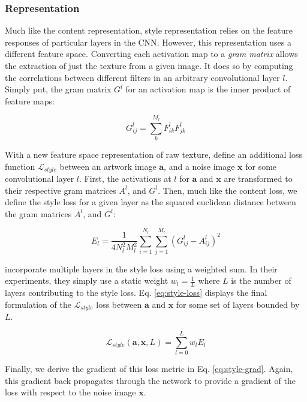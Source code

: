 \documentclass{article}
\begin{document}
\subsubsection{Representation}

Much like the content representation, style representation relies on the
feature responses of particular layers in the \ac{CNN}. However, this
representation uses a different feature space. Converting each activation
map to a \textit{gram matrix} allows the extraction of just the texture from
a given image. It does so by computing the correlations between different
filters in an arbitrary convolutional layer $l$. Simply put, the gram matrix
$G^l$ for an activation map is the inner product of feature maps:

\begin{equation}
G_{i j}^l = \sum_{k}^{M_l} F_{i k}^l F_{j k}^l
\end{equation}

With a new feature space representation of raw texture,
\cite{2015arXiv150806576G} define an additional loss function
$\mathcal{L}_{style}$ between an artwork image $\textbf{a}$, and a noise image
$\textbf{x}$ for some convolutional layer $l$. First, the activations at $l$
for $\textbf{a}$ and $\textbf{x}$ are transformed to their respective gram
matrices $A^l$, and $G^l$. Then, much like the content loss, we define
the style loss for a given layer as the squared euclidean distance between the
gram matrices $A^l$, and $G^l$:

\begin{equation}
E_l =
\frac{1}{4 N_l^2 M_l^2}
\sum_{i=1}^{N_l}\sum_{j=1}^{M_l}
(G^l_{ij} - A^l_{ij})^2
\end{equation}

\cite{2015arXiv150806576G} incorporate multiple layers in the style loss using
a weighted sum. In their experiments, they simply use a static weight
$w_l = \frac{1}{L}$ where $L$ is the number of layers contributing to the
style loss. Eq. \ref{eq:style-loss} displays the final formulation of the
$\mathcal{L}_{style}$ loss between $\textbf{a}$ and $\textbf{x}$ for some set
of layers bounded by $L$.

\begin{equation}
\label{eq:style-loss}
\mathcal{L}_{style}(\mathbf{a}, \mathbf{x}, L) = \sum_{l=0}^L w_l E_l
\end{equation}

Finally, we derive the gradient of this loss metric in Eq.
\ref{eq:style-grad}. Again, this gradient back propagates through the network
to provide a gradient of the loss with respect to the noise image
$\textbf{x}$.
\end{document}
